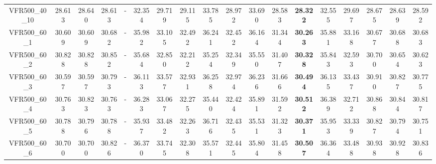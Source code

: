 \begin{tabular}{cc|ccc|ccccccccccccc}
VFR500\_40\_10     & 28.613           & 28.640           & 28.613           & -                & 32.354           & 29.719           & 29.115           & 33.785           & 28.972           & 33.690           & 28.583           & {\bf 28.322}     & 32.555           & 29.697           & 28.675           & 28.639           & 28.592          \\ 
VFR500\_60\_1      & 30.609           & 30.609           & 30.682           & -                & 35.982           & 33.105           & 32.492           & 36.241           & 32.452           & 36.164           & 31.344           & {\bf 30.263}     & 35.881           & 33.168           & 30.677           & 30.688           & 30.683          \\ 
VFR500\_60\_2      & 30.828           & 30.828           & 30.852           & -                & 35.684           & 32.850           & 32.212           & 35.254           & 32.349           & 35.550           & 31.407           & {\bf 30.328}     & 35.843           & 32.593           & 30.700           & 30.654           & 30.623          \\ 
VFR500\_60\_3      & 30.597           & 30.597           & 30.793           & -                & 36.113           & 33.577           & 32.931           & 36.258           & 32.974           & 36.236           & 31.666           & {\bf 30.494}     & 36.135           & 33.437           & 30.910           & 30.827           & 30.775          \\ 
VFR500\_60\_4      & 30.763           & 30.823           & 30.763           & -                & 36.283           & 33.067           & 32.275           & 35.440           & 32.424           & 35.891           & 31.592           & {\bf 30.512}     & 36.389           & 32.712           & 30.868           & 30.844           & 30.817          \\ 
VFR500\_60\_5      & 30.788           & 30.796           & 30.788           & -                & 35.937           & 33.482           & 32.263           & 36.716           & 32.435           & 35.531           & 31.323           & {\bf 30.371}     & 35.953           & 33.339           & 30.827           & 30.794           & 30.751          \\ 
VFR500\_60\_6      & 30.700           & 30.700           & 30.826           & -                & 36.370           & 33.745           & 32.308           & 35.571           & 32.445           & 35.804           & 31.458           & {\bf 30.507}     & 36.364           & 33.488           & 30.938           & 30.928           & 30.836          \\ 

\end{tabular}
